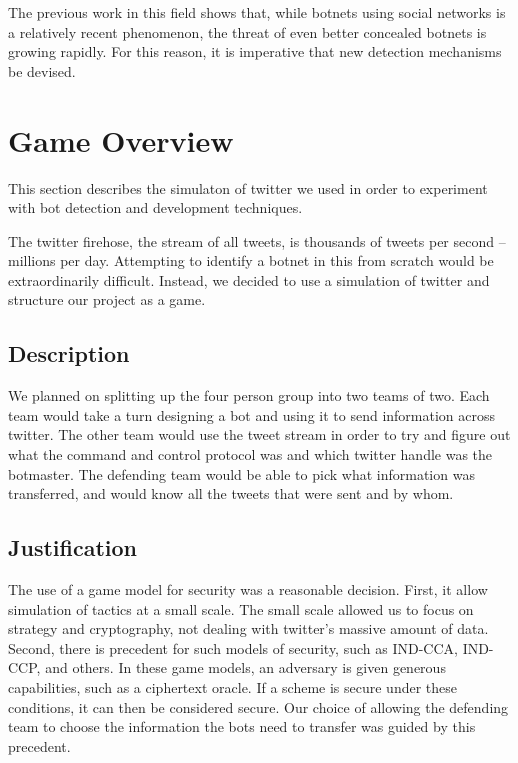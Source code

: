 \documentclass[11pt, oneside]{article} %
\numberwithin{equation}{section} %
\numberwithin{figure}{section} %
\numberwithin{table}{section} %
\begin{document}
The previous work in this field shows that, while botnets using social networks is a relatively recent phenomenon, the threat of even better concealed botnets is growing rapidly. For this reason, it is imperative that new detection mechanisms be devised.

\section{Game Overview}
	This section describes the simulaton of twitter we used in order to experiment with bot
	detection and development techniques.

	The twitter firehose, the stream of all tweets, is 
	thousands of tweets per second -- millions per day. Attempting to
	identify a botnet in this from scratch would be extraordinarily difficult.
	Instead, we decided to use a simulation of twitter and structure our
	project as a game.
	
	\subsection{Description}
		We planned on splitting up the four person group into two teams of two.
		Each team would take a turn designing a bot and using it to send information
		across twitter. The other team would use the tweet stream in order
		to try and figure out what the command and control protocol was
		and which twitter handle was the botmaster. The defending team
		would be able to pick what information was transferred, and would
		know all the tweets that were sent and by whom.

	\subsection{Justification}
		The use of a game model for security was a reasonable decision.
		First, it allow simulation of tactics at a small scale. The small
		scale allowed us to focus on strategy and cryptography, not
		dealing with twitter's massive amount of data. Second, there
		is precedent for such models of security, such as \textsf{IND-CCA},
		\textsf{IND-CCP}, and others. In these game models, an adversary
		is given generous capabilities, such as a ciphertext oracle.
		If a scheme is secure under these conditions, it can then
		be considered secure. Our choice of allowing the defending team
		to choose the information the bots need to transfer was guided
		by this precedent.
\end{document}
